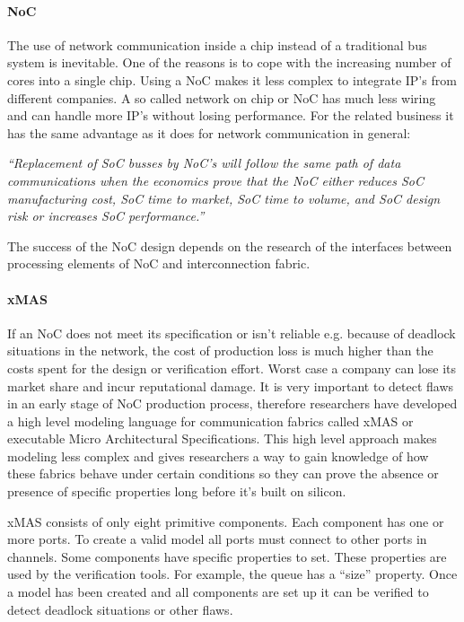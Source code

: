 \paragraph{NoC}

The use of network communication inside a chip instead of a traditional bus
system is inevitable. One of the reasons is to cope with the increasing number
of cores into a single chip. Using a NoC makes it less complex to integrate IP's from
different companies. A so called network on chip or NoC has much less wiring
\cite{NoC-busses} and can handle more IP's without losing performance. For the
related business it has the same advantage as it does for network communication
in general:

\textit{``Replacement of SoC busses by NoC's will follow the same path of data
communications when the economics prove that the NoC either reduces SoC
manufacturing cost, SoC time to market, SoC time to volume, and SoC design risk
or increases SoC performance.''} \cite{NoC-busses} 

The success of the NoC design depends on the research of the interfaces between
processing elements of NoC and interconnection fabric.

\paragraph{xMAS}

If an NoC does not meet its specification or isn't reliable e.g. because of
deadlock situations in the network, the cost of production loss is much higher
than the costs spent for the design or verification effort. Worst case a
company can lose its market share and incur reputational damage.
It is very important to detect flaws in an early stage of NoC production
process, therefore researchers have developed a high level modeling language for
communication fabrics called xMAS or executable Micro Architectural
Specifications. This high level approach makes modeling less complex and gives
researchers a way to gain knowledge of how these fabrics behave under certain
conditions so they can prove the absence or presence of specific properties long
before it's built on silicon.

xMAS consists of only eight primitive components. Each component has one or more
ports. To create a valid model all ports must connect to other ports in channels. Some
components have specific properties to set. These properties are used by the
verification tools. For example, the queue has a ``size'' property. Once a model
has been created and all components are set up it can be verified to detect
deadlock situations or other flaws.

